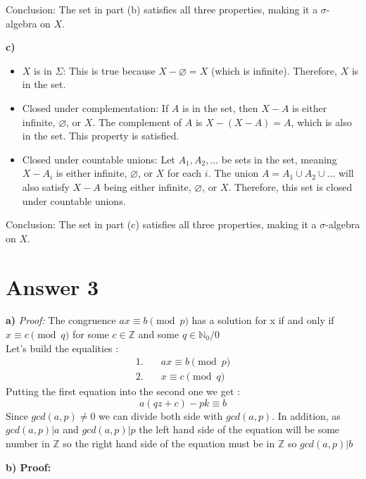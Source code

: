 \documentclass[12pt]{article}
\begin{document}
Conclusion: The set in part (b) satisfies all three properties, making it a \( \sigma \)-algebra on \( X \).

\textbf{c)}
\begin{itemize}
    \item \( X \) is in \( \Sigma \): This is true because \( X - \varnothing = X \) (which is infinite). Therefore, \( X \) is in the set.
    \item Closed under complementation: If \( A \) is in the set, then \( X - A \) is either infinite, \( \varnothing \), or \( X \). The complement of \( A \) is \( X - (X - A) = A \), which is also in the set. This property is satisfied.
    \item Closed under countable unions: Let \( A_1, A_2, \ldots \) be sets in the set, meaning \( X - A_i \) is either infinite, \( \varnothing \), or \( X \) for each \( i \). The union \( A = A_1 \cup A_2 \cup \ldots \) will also satisfy \( X - A \) being either infinite, \( \varnothing \), or \( X \). Therefore, this set is closed under countable unions.
\end{itemize}

Conclusion: The set in part (c) satisfies all three properties, making it a \( \sigma \)-algebra on \( X \).




\section*{Answer 3}

\textbf{a)}
\textit{Proof:}
The congruence  $ ax \equiv  b\pmod{p} $ has a solution for x if and only if $ x \equiv c \pmod{q} $ for some $c \in \mathbb{Z}$ and some $q \in \mathbb{N}_0/{0}$\\
Let's build the equalities : 
\begin{align}
    1. & \quad ax \equiv b \pmod{p} \tag{1} \\
    2. & \quad x \equiv c \pmod{q} \tag{2}
\end{align}
Putting the first equation into the second one we get :
$$ a(qz + c) - pk \equiv b$$
Since $gcd(a,p) \neq 0$ we can divide both side with $gcd(a,p)$. In addition, as $ gcd(a,p) | a $ and $ gcd(a,p) | p $ the left hand side of the equation will be some number in  $ \mathbb{Z}$ so the right hand side of the equation must be in $\mathbb{Z}$ so $gcd(a,p)|b$ 






\textbf{b) Proof:}
\end{document}
